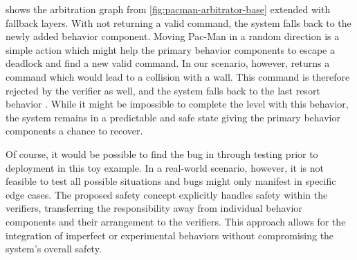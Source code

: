  shows the arbitration graph from \cref{fig:pacman-arbitrator-base} extended with fallback layers.
With  not returning a valid command, the system falls back to the newly added  behavior component.
Moving Pac-Man in a random direction is a simple action which might help the primary behavior components to escape a deadlock and find a new valid command.
In our scenario, however,  returns a command which would lead to a collision with a wall.
This command is therefore rejected by the verifier as well, and the system falls back to the last resort behavior .
While it might be impossible to complete the level with this behavior, the system remains in a predictable and safe state giving the primary behavior components a chance to recover.

Of course, it would be possible to find the bug in  through testing prior to deployment in this toy example.
In a real-world scenario, however, it is not feasible to test all possible situations and bugs might only manifest in specific edge cases.
The proposed safety concept explicitly handles safety within the verifiers, transferring the responsibility away from individual behavior components and their arrangement to the verifiers.
This approach allows for the integration of imperfect or experimental behaviors without compromising the system's overall safety.

